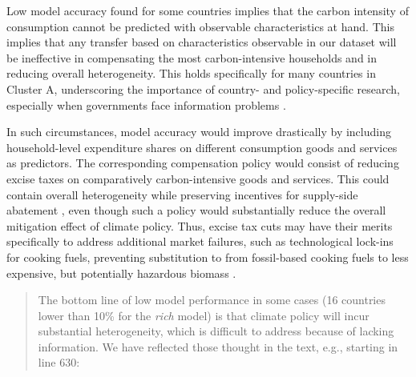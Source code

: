 \documentclass[11pt]{article}
\newenvironment{response}
{\begin{quote}\color{black}}
{\end{quote}}
\begin{document}
\begin{revisionbox}
    Low model accuracy found for some countries implies that the carbon intensity of consumption cannot be predicted with observable characteristics at hand. This implies that any transfer based on characteristics observable in our dataset will be ineffective in compensating the most carbon-intensive households and in reducing overall heterogeneity. This holds specifically for many countries in Cluster A, underscoring the importance of country- and policy-specific research, especially when governments face information problems \autocite{Mirrlees.1971}.

    In such circumstances, model accuracy would improve drastically by including household-level expenditure shares on different consumption goods and services as predictors. The corresponding compensation policy would consist of reducing excise taxes on comparatively carbon-intensive goods and services. This could contain overall heterogeneity while preserving incentives for supply-side abatement \autocite{Goulder.2008}, even though such a policy would substantially reduce the overall mitigation effect of climate policy. Thus, excise tax cuts may have their merits specifically to address additional market failures, such as technological lock-ins for cooking fuels, preventing substitution to from fossil-based cooking fuels to less expensive, but potentially hazardous biomass \autocite{Greve.2022}.
\end{revisionbox}

\begin{response}
    The bottom line of low model performance in some cases (16 countries lower than 10\% for the \textit{rich} model) is that climate policy will incur substantial heterogeneity, which is difficult to address because of lacking information. We have reflected those thought in the text, e.g., starting in line 630:
    
\end{response}
\end{document}
